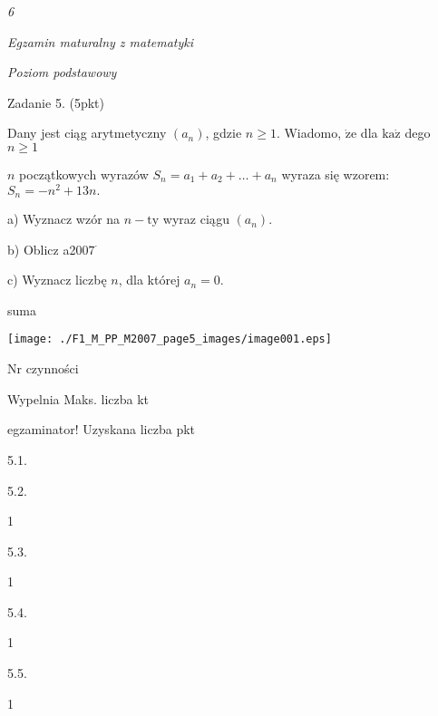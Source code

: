 \documentclass[a4paper,12pt]{article}
\begin{document}
{\it 6}

{\it Egzamin maturalny z matematyki}

{\it Poziom podstawowy}

Zadanie 5. (5pkt)

Dany jest ciąg arytmetyczny $(a_{n})$, gdzie $n\geq 1$. Wiadomo, $\dot{\mathrm{z}}\mathrm{e}$ dla $\mathrm{k}\mathrm{a}\dot{\mathrm{z}}$ dego $n\geq 1$

$n$ początkowych wyrazów $S_{n}=a_{1}+a_{2}+\ldots+a_{n}$ wyraza się wzorem: $S_{n}=-n^{2}+13n.$

a) Wyznacz wzór na $n-\mathrm{t}\mathrm{y}$ wyraz ciągu $(a_{n}).$

b) Oblicz a200$7^{\cdot}$

c) Wyznacz liczbę $n$, dla której $a_{n}=0.$

suma
\begin{center}
\texttt{[image: ./F1\_M\_PP\_M2007\_page5\_images/image001.eps]}
\end{center}
Nr czynności

Wypelnia Maks. liczba kt

egzaminator! Uzyskana liczba pkt

5.1.

5.2.

1

5.3.

1

5.4.

1

5.5.

1
\end{document}
